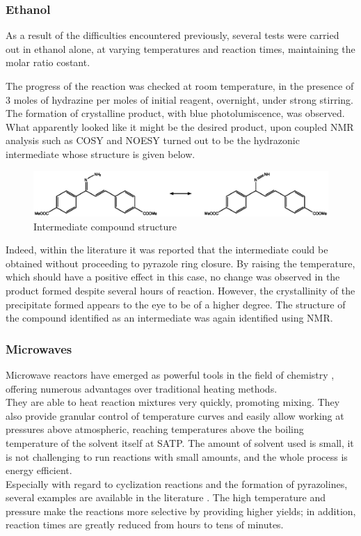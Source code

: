 \documentclass[../Master.tex]{subfiles}
\begin{document}
\subsubsection{Ethanol}\label{sec:met-only}

As a result of the difficulties encountered previously, several tests were carried out in ethanol alone, at varying temperatures and reaction times, maintaining the molar ratio costant.

The progress of the reaction was checked at room temperature, in the presence of 3 moles of hydrazine per moles of initial reagent, overnight, under strong stirring. The formation of crystalline product, with blue photolumiscence, was observed. What apparently looked like it might be the desired product, upon coupled NMR analysis such as COSY and NOESY turned out to be the hydrazonic intermediate whose structure is given below.

\begin{figure}[h!]
	\centering
	\includegraphics[width=13cm,keepaspectratio]{Structures/idrazone.eps}
	\caption{Intermediate compound structure}
\end{figure}

Indeed, within the literature it was reported that the intermediate could be obtained without proceeding to pyrazole ring closure. By raising the temperature, which should have a positive effect in this case, no change was observed in the product formed despite several hours of reaction. However, the crystallinity of the precipitate formed appears to the eye to be of a higher degree. The structure of the compound identified as an intermediate was again identified using NMR.

\subsubsection{Microwaves}\label{sec:micro}

Microwave reactors have emerged as powerful tools in the field of chemistry \cite{priecel_advantages_2019}, offering numerous advantages over traditional heating methods. \\
They are able to heat reaction mixtures very quickly, promoting mixing. They also provide granular control of temperature curves and easily allow working at pressures above atmospheric, reaching temperatures above the boiling temperature of the solvent itself at SATP. The amount of solvent used is small, it is not challenging to run reactions with small amounts, and the whole process is energy efficient. \\
Especially with regard to cyclization reactions and the formation of pyrazolines, several examples are available in the literature \cite{azarifar_microwave-assisted_2003}. The high temperature and pressure make the reactions more selective by providing higher yields; in addition, reaction times are greatly reduced from hours to tens of minutes.
\end{document}
